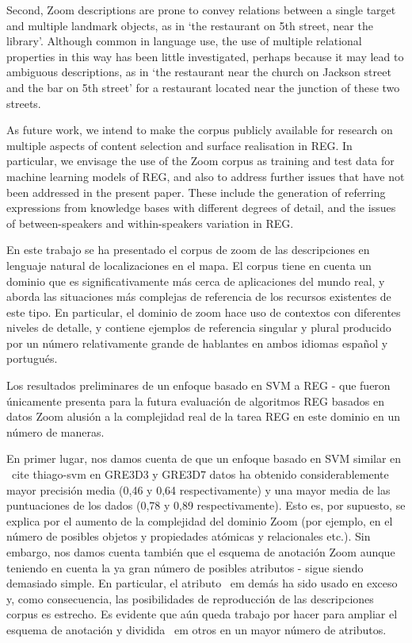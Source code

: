Second, Zoom descriptions are prone to convey relations between a single target and multiple landmark objects, as in `the restaurant on 5th street, near the library'. Although common in language use, the use of multiple relational properties in this way has been little investigated, perhaps because it may lead to ambiguous descriptions, as in `the restaurant near the church on Jackson street and the bar on 5th street' for a restaurant located near the junction of these two streets.

As future work, we intend to make the corpus publicly available for research on multiple aspects of content selection and surface realisation in REG. In particular, we envisage the use of the Zoom corpus as training and test data for machine learning models of REG, and also to address further issues that have not been addressed in the present paper. These include  the generation of referring expressions from knowledge bases with different degrees of detail, and the issues of between-speakers and within-speakers variation in REG.


En este trabajo se ha presentado el corpus de zoom de las descripciones en lenguaje natural de localizaciones en el mapa. El corpus tiene en cuenta un dominio que es significativamente m\'as cerca de aplicaciones del mundo real, y aborda las situaciones m\'as complejas de referencia de los recursos existentes de este tipo. En particular, el dominio de zoom hace uso de contextos con diferentes niveles de detalle, y contiene ejemplos de referencia singular y plural producido por un n\'umero relativamente grande de hablantes en ambos idiomas espa\~nol y portugu\'es.

Los resultados preliminares de un enfoque basado en SVM a REG - que fueron \'unicamente presenta para la futura evaluaci\'on de algoritmos REG basados ​​en datos Zoom \- alusi\'on a la complejidad real de la tarea REG en este dominio en un n\'umero de maneras.

En primer lugar, nos damos cuenta de que un enfoque basado en SVM similar en \ cite {thiago-svm} en GRE3D3 y GRE3D7 datos ha obtenido considerablemente mayor precisi\'on media (0,46 y 0,64 respectivamente) y una mayor media de las puntuaciones de los dados (0,78 y 0,89 respectivamente). Esto es, por supuesto, se explica por el aumento de la complejidad del dominio Zoom (por ejemplo, en el n\'umero de posibles objetos y propiedades at\'omicas y relacionales etc.). Sin embargo, nos damos cuenta tambi\'en que el esquema de anotaci\'on Zoom \- aunque teniendo en cuenta la ya gran n\'umero de posibles atributos - sigue siendo demasiado simple. En particular, el atributo {\ em dem\'as} ha sido usado en exceso y, como consecuencia, las posibilidades de reproducci\'on de las descripciones corpus es estrecho. Es evidente que a\'un queda trabajo por hacer para ampliar el esquema de anotaci\'on y dividida {\ em otros} en un mayor n\'umero de atributos.

